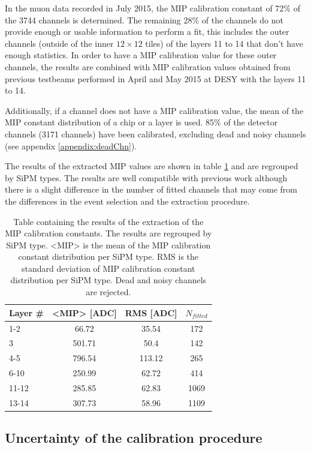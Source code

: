In the muon data recorded in July 2015, the MIP calibration constant of 72\% of the 3744 channels is determined. The remaining 28\% of the channels do not provide enough or usable information to perform a fit, this includes the outer channels (outside of the inner $12 \times 12$ tiles) of the layers 11 to 14 that don't have enough statistics. In order to have a MIP calibration value for these outer channels, the results are combined with MIP calibration values obtained from previous testbeams performed in April and May 2015 at DESY with the layers 11 to 14.

Additionally, if a channel does not have a MIP calibration value, the mean of the MIP constant distribution of a chip or a layer is used. 85\% of the detector channels (3171 channels) have been calibrated, excluding dead and noisy channels (see appendix \ref{appendix:deadChn}).

The results of the extracted MIP values are shown in table \ref{table:MIPAHCAL} and are regrouped by SiPM types. The results are well compatible with previous work \cite{SarahMaster} although there is a slight difference in the number of fitted channels that may come from the differences in the event selection and the extraction procedure.

\begin{table}[htb!]
	\centering
	\caption{Table containing the results of the extraction of the MIP calibration constants. The results are regrouped by SiPM type. <MIP> is the mean of the MIP calibration constant distribution per SiPM type. RMS is the standard deviation of MIP calibration constant distribution per SiPM type. Dead and noisy channels are rejected.}
	\label{table:MIPAHCAL}
	\begin{tabular}{@{} lccc @{}}
		\toprule
		Layer \# & <MIP> [ADC] & RMS [ADC] & $N_{fitted}$\\
		\midrule
		1-2 & 66.72 & 35.54 & 172\\
		3 & 501.71 & 50.4 & 142\\
		4-5 & 796.54 & 113.12 & 265\\
		6-10 & 250.99 & 62.72 & 414\\
		11-12 & 285.85 & 62.83 & 1069\\
		13-14 & 307.73 & 58.96 & 1109\\
		\bottomrule
	\end{tabular}
\end{table}

\subsection{Uncertainty of the calibration procedure}

